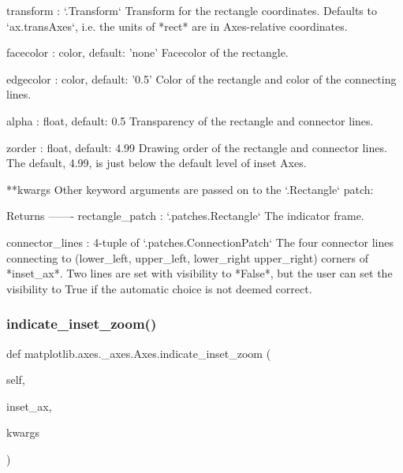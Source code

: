 \begin{DoxyVerb}
\begin{DoxyVerb}
transform : `.Transform`
    Transform for the rectangle coordinates. Defaults to
    `ax.transAxes`, i.e. the units of *rect* are in Axes-relative
    coordinates.

facecolor : color, default: 'none'
    Facecolor of the rectangle.

edgecolor : color, default: '0.5'
    Color of the rectangle and color of the connecting lines.

alpha : float, default: 0.5
    Transparency of the rectangle and connector lines.

zorder : float, default: 4.99
    Drawing order of the rectangle and connector lines.  The default,
    4.99, is just below the default level of inset Axes.

**kwargs
    Other keyword arguments are passed on to the `.Rectangle` patch:


Returns
-------
rectangle_patch : `.patches.Rectangle`
     The indicator frame.

connector_lines : 4-tuple of `.patches.ConnectionPatch`
    The four connector lines connecting to (lower_left, upper_left,
    lower_right upper_right) corners of *inset_ax*. Two lines are
    set with visibility to *False*,  but the user can set the
    visibility to True if the automatic choice is not deemed correct.\end{DoxyVerb}
 \mbox{\label{classmatplotlib_1_1axes_1_1__axes_1_1Axes_a143f187ab0e609daaa6b4830895409bd}} 
\subsubsection{\texorpdfstring{indicate\+\_\+inset\+\_\+zoom()}{indicate\_inset\_zoom()}}
{\footnotesize\ttfamily def matplotlib.\+axes.\+\_\+axes.\+Axes.\+indicate\+\_\+inset\+\_\+zoom (\begin{DoxyParamCaption}\item[{}]{self,  }\item[{}]{inset\+\_\+ax,  }\item[{}]{kwargs }\end{DoxyParamCaption})}


\end{DoxyVerb}
